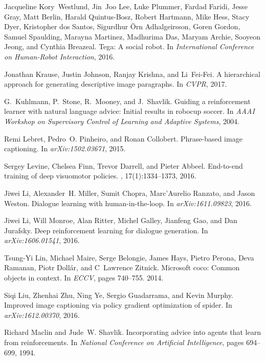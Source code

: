\documentclass{article}
\begin{document}
\begin{thebibliography}{10}
Jacqueline Kory~Westlund, Jin~Joo Lee, Luke Plummer, Fardad Faridi, Jesse Gray,
  Matt Berlin, Harald Quintus-Bosz, Robert Hartmann, Mike Hess, Stacy Dyer,
  Kristopher dos Santos, Sigurdhur \"{O}rn Adhalgeirsson, Goren Gordon, Samuel
  Spaulding, Marayna Martinez, Madhurima Das, Maryam Archie, Sooyeon Jeong, and
  Cynthia Breazeal.
\newblock Tega: A social robot.
\newblock In {\em International Conference on Human-Robot Interaction}, 2016.

Jonathan Krause, Justin Johnson, Ranjay Krishna, and Li~Fei-Fei.
\newblock A hierarchical approach for generating descriptive image paragraphs.
\newblock In {\em CVPR}, 2017.

G.~Kuhlmann, P.~Stone, R.~Mooney, and J.~Shavlik.
\newblock Guiding a reinforcement learner with natural language advice: Initial
  results in robocup soccer.
\newblock In {\em AAAI Workshop on Supervisory Control of Learning and Adaptive
  Systems}, 2004.

Remi Lebret, Pedro~O. Pinheiro, and Ronan Collobert.
\newblock Phrase-based image captioning.
\newblock In {\em arXiv:1502.03671}, 2015.

Sergey Levine, Chelsea Finn, Trevor Darrell, and Pieter Abbeel.
\newblock End-to-end training of deep visuomotor policies.
, 17(1):1334--1373, 2016.

Jiwei Li, Alexander~H. Miller, Sumit Chopra, Marc'Aurelio Ranzato, and Jason
  Weston.
\newblock Dialogue learning with human-in-the-loop.
\newblock In {\em arXiv:1611.09823}, 2016.

Jiwei Li, Will Monroe, Alan Ritter, Michel Galley, Jianfeng Gao, and Dan
  Jurafsky.
\newblock Deep reinforcement learning for dialogue generation.
\newblock In {\em arXiv:1606.01541}, 2016.

Tsung-Yi Lin, Michael Maire, Serge Belongie, James Hays, Pietro Perona, Deva
  Ramanan, Piotr Doll{\'a}r, and C~Lawrence Zitnick.
\newblock Microsoft coco: Common objects in context.
\newblock In {\em ECCV}, pages 740--755. 2014.

Siqi Liu, Zhenhai Zhu, Ning Ye, Sergio Guadarrama, and Kevin Murphy.
\newblock Improved image captioning via policy gradient optimization of spider.
\newblock In {\em arXiv:1612.00370}, 2016.

Richard Maclin and Jude~W. Shavlik.
\newblock Incorporating advice into agents that learn from reinforcements.
\newblock In {\em National Conference on Artificial Intelligence}, pages
  694--699, 1994.


\end{thebibliography}
\end{document}
